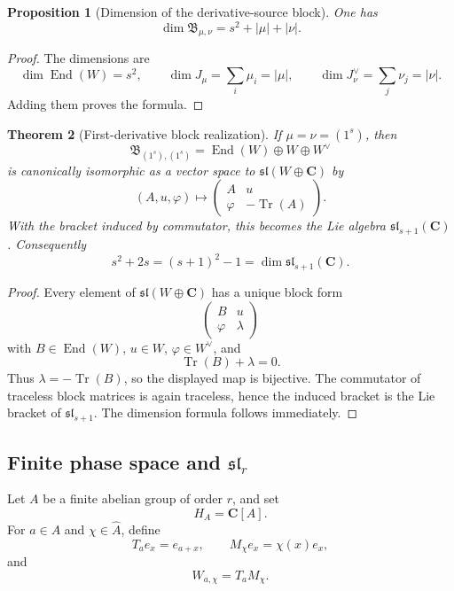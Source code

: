 \documentclass[11pt]{article}
\newcommand{\C}{\mathbf C}
\newcommand{\Tr}{\operatorname{Tr}}
\newcommand{\End}{\operatorname{End}}
\theoremstyle{plain}
\newtheorem{theorem}{Theorem}[section]
\newtheorem{proposition}[theorem]{Proposition}
\theoremstyle{definition}
\begin{document}
\begin{proposition}[Dimension of the derivative-source block]\label{prop:source-dim}
One has
\[
   \dim \mathfrak B_{\mu,\nu}=s^2+|\mu|+|\nu|.
\]
\end{proposition}

\begin{proof}
The dimensions are
\[
   \dim\End(W)=s^2,
   \qquad
   \dim J_\mu=\sum_i\mu_i=|\mu|,
   \qquad
   \dim J_\nu^\vee=\sum_j\nu_j=|\nu|.
\]
Adding them proves the formula.
\end{proof}

\begin{theorem}[First-derivative block realization]\label{thm:first-derivative-sl}
If \(\mu=\nu=(1^s)\), then
\[
   \mathfrak B_{(1^s),(1^s)}=\End(W)\oplus W\oplus W^\vee
\]
is canonically isomorphic as a vector space to \(\mathfrak{sl}(W\oplus\C)\) by
\[
   (A,u,\varphi)
   \longmapsto
   \begin{pmatrix}
   A & u\\
   \varphi & -\Tr(A)
   \end{pmatrix}.
\]
With the bracket induced by commutator, this becomes the Lie algebra \(\mathfrak{sl}_{s+1}(\C)\).  Consequently
\[
   s^2+2s=(s+1)^2-1=\dim \mathfrak{sl}_{s+1}(\C).
\]
\end{theorem}

\begin{proof}
Every element of \(\mathfrak{sl}(W\oplus\C)\) has a unique block form
\[
   \begin{pmatrix}
   B & u\\
   \varphi & \lambda
   \end{pmatrix}
\]
with \(B\in\End(W)\), \(u\in W\), \(\varphi\in W^\vee\), and
\[
   \Tr(B)+\lambda=0.
\]
Thus \(\lambda=-\Tr(B)\), so the displayed map is bijective.  The commutator of traceless block matrices is again traceless, hence the induced bracket is the Lie bracket of \(\mathfrak{sl}_{s+1}\).  The dimension formula follows immediately.
\end{proof}

\subsection{Finite phase space and \texorpdfstring{\(\mathfrak{sl}_r\)}{slr}}

Let \(A\) be a finite abelian group of order \(r\), and set
\[
   H_A=\C[A].
\]
For \(a\in A\) and \(\chi\in\widehat A\), define
\[
   T_ae_x=e_{a+x},
   \qquad
   M_\chi e_x=\chi(x)e_x,
\]
and
\[
   W_{a,\chi}=T_aM_\chi.
\]
\end{document}
